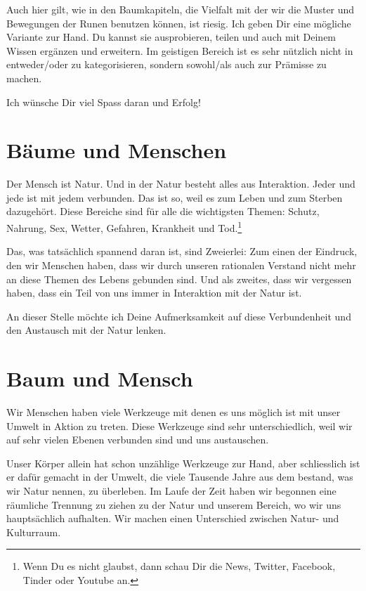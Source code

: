 \documentclass[11pt,titlepage,a5paper]{book}
\begin{document}
 Auch hier gilt, wie in den Baumkapiteln, die Vielfalt mit der wir die Muster und Bewegungen der Runen benutzen können, ist riesig. Ich geben Dir eine mögliche Variante zur Hand. Du kannst sie ausprobieren, teilen und auch mit Deinem Wissen ergänzen und erweitern. Im geistigen Bereich ist es sehr nützlich nicht in entweder/oder zu kategorisieren, sondern sowohl/als auch zur Prämisse zu machen. 
 
Ich wünsche Dir viel Spass daran und Erfolg!

\chapter{Bäume und Menschen}

Der Mensch ist Natur. Und in der Natur besteht alles aus Interaktion. Jeder und jede ist mit jedem verbunden. Das ist so, weil es zum Leben und zum Sterben dazugehört. Diese Bereiche sind für alle die wichtigsten Themen: Schutz, Nahrung, Sex, Wetter, Gefahren, Krankheit und Tod.\footnote{Wenn Du es nicht glaubst, dann schau Dir die News, Twitter, Facebook, Tinder oder Youtube an.}

Das, was tatsächlich spannend daran ist, sind Zweierlei: Zum einen der Eindruck, den wir Menschen haben, dass wir durch unseren rationalen Verstand nicht mehr an diese Themen des Lebens gebunden  sind. Und als zweites, dass wir vergessen haben, dass ein Teil von uns immer in Interaktion mit der Natur ist.

An dieser Stelle  möchte ich Deine Aufmerksamkeit auf diese Verbundenheit und den Austausch mit der Natur lenken.


\chapter{Baum und Mensch}

Wir Menschen haben viele Werkzeuge mit denen es uns möglich ist mit unser Umwelt in Aktion zu treten. Diese Werkzeuge sind sehr unterschiedlich, weil wir auf sehr vielen Ebenen verbunden sind und uns austauschen. 

Unser Körper allein hat schon unzählige Werkzeuge zur Hand, aber schliesslich ist er dafür gemacht in der Umwelt, die viele Tausende Jahre aus dem bestand, was wir Natur nennen, zu überleben. Im Laufe der Zeit haben wir begonnen eine räumliche Trennung zu ziehen zu der Natur und unserem Bereich, wo wir uns hauptsächlich aufhalten. Wir machen einen Unterschied zwischen Natur- und Kulturraum.
\end{document}
